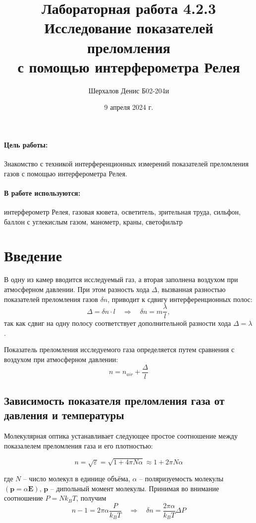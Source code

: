 \documentclass[a4paper,12pt]{article}
\author{Шерхалов Денис Б02-204и}
\title{Лабораторная работа 4.2.3 \\
	\textbf{Исследование показателей преломления \\
    с помощью интерферометра Релея}}
\date{9 апреля 2024 г.}
\theoremstyle{definition}
\begin{document}
	
{\Large \maketitle}

	\paragraph*{Цель работы:} Знакомство с техникой интерференционных измерений показателей преломления газов с помощью интерферометра Релея.
	\paragraph*{В работе используются:} интерферометр Релея, газовая кювета, осветитель, зрительная труда, сильфон, баллон с углекислым газом, манометр, краны, светофильтр

\section{Введение}

В одну из камер вводится исследуемый газ, а вторая заполнена воздухом при атмосферном давлении. При этом разность хода $\Delta$, вызванная разностью показателей преломления газов $\delta n$, приводит к сдвигу интерференционных полос:
\begin{equation}
    \Delta = \delta n \cdot l \quad \Rightarrow \quad \delta n = m \frac{\lambda}{l},
\end{equation}
так как сдвиг на одну полосу соответствует дополнительной разности хода $\Delta = \lambda$.
\par Показатель преломления исследуемого газа определяется путем сравнения с воздухом при атмосферном давлении:
\begin{equation}
    n = n_{air} + \dfrac{\Delta}{l}
\end{equation}

\subsection*{Зависимость показателя преломления газа от давления и температуры} 
Молекулярная оптика устанавливает следующее простое соотношение между показалелем преломления газа и его плотностью:

$$n = \sqrt{\varepsilon} = \sqrt{1 + 4 \pi N \alpha} \approx 1+2 \pi N \alpha$$

где $N$ -- число молекул в единице объёма, $\alpha$ -- поляризуемость молекулы $(\textbf{p} = \alpha \textbf{E})$,
$\textbf{p}$ -- дипольный момент молекулы. Принимая во внимание соотношение $P = N k_B T$, получим
$$n - 1 = 2 \pi \alpha \dfrac{P}{k_B T} \quad \Rightarrow \quad \delta n = \dfrac{2 \pi \alpha}{k_B T} \Delta P$$
\end{document}
